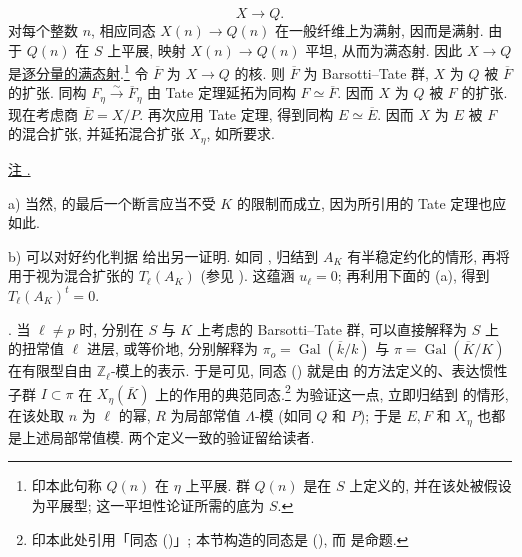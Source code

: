 \begin{equation*}
X\longrightarrow Q.
\end{equation*}
对每个整数 $n$, 相应同态 $X(n)\longrightarrow Q(n)$ 在一般纤维上为满射, 因而是满射. 由于 $Q(n)$ 在 $S$ 上平展, 映射 $X(n)\longrightarrow Q(n)$ 平坦, 从而为满态射. 因此 $X\longrightarrow Q$ 是\underline{逐分量的满态射}.\footnote{印本此句称 $Q(n)$ 在 $\eta$ 上平展. 群 $Q(n)$ 是在 $S$ 上定义的, 并在该处被假设为平展型; 这一平坦性论证所需的底为 $S$.} 令 $\overline F$ 为 $X\longrightarrow Q$ 的核. 则 $\overline F$ 为 Barsotti--Tate 群, $X$ 为 $Q$ 被 $\overline F$ 的扩张. 同构 $F_\eta\xrightarrow{\sim}\overline F_\eta$ 由 Tate 定理延拓为同构 $F\simeq\overline F$. 因而 $X$ 为 $Q$ 被 $F$ 的扩张. 现在考虑商 $\overline E=X/P$. 再次应用 Tate 定理, 得到同构 $E\simeq\overline E$. 因而 $X$ 为 $E$ 被 $F$ 的混合扩张, 并延拓混合扩张 $X_\eta$, 如所要求.

\medskip
\noindent
\underline{注 .}

\smallskip
\noindent
a) 当然,  的最后一个断言应当不受 $K$ 的限制而成立, 因为所引用的 Tate 定理也应如此.

\smallskip
\noindent
b) 可以对好约化判据  给出另一证明. 如同 , 归结到 $A_K$ 有半稳定约化的情形, 再将  用于视为混合扩张的 $T_\ell(A_K)$ (参见 ). 这蕴涵 $u_\ell=0$; 再利用下面的 (a), 得到 $T_\ell(A_K)^t=0$.

\medskip
\noindent
{}. 当 $\ell\neq p$ 时, 分别在 $S$ 与 $K$ 上考虑的 Barsotti--Tate 群, 可以直接解释为 $S$ 上的扭常值 $\ell$ 进层, 或等价地, 分别解释为 $\pi_o=\operatorname{Gal}(\overline k/k)$ 与 $\pi=\operatorname{Gal}(\overline K/K)$ 在有限型自由 $\mathbb Z_\ell$-模上的表示. 于是可见, 同态 () 就是由  的方法定义的、表达惯性子群 $I\subset\pi$ 在 $X_\eta(\overline K)$ 上的作用的典范同态.\footnote{印本此处引用「同态 ()」; 本节构造的同态是 (), 而  是命题.} 为验证这一点, 立即归结到  的情形, 在该处取 $n$ 为 $\ell$ 的幂, $R$ 为局部常值 $\Lambda$-模 (如同 $Q$ 和 $P$); 于是 $E,F$ 和 $X_\eta$ 也都是上述局部常值模. 两个定义一致的验证留给读者.

